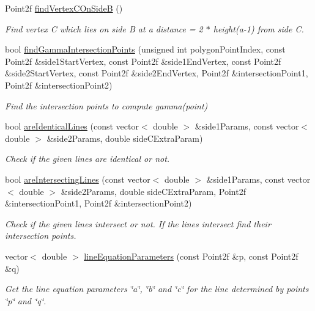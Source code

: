 \begin{DoxyCompactItemize}
Point2f \hyperlink{classmultiscale_1_1MinEnclosingTriangleFinder_ab0b488d2d67f2d22077777eebc292c1a}{find\-Vertex\-C\-On\-Side\-B} ()
\begin{DoxyCompactList}\small\item\em Find vertex C which lies on side B at a distance = 2 $\ast$ height(a-\/1) from side C. \end{DoxyCompactList}\item 
bool \hyperlink{classmultiscale_1_1MinEnclosingTriangleFinder_a9eedc43ea3190d8ee6343879dc100edb}{find\-Gamma\-Intersection\-Points} (unsigned int polygon\-Point\-Index, const Point2f \&side1\-Start\-Vertex, const Point2f \&side1\-End\-Vertex, const Point2f \&side2\-Start\-Vertex, const Point2f \&side2\-End\-Vertex, Point2f \&intersection\-Point1, Point2f \&intersection\-Point2)
\begin{DoxyCompactList}\small\item\em Find the intersection points to compute gamma(point) \end{DoxyCompactList}\item 
bool \hyperlink{classmultiscale_1_1MinEnclosingTriangleFinder_a65a15d407aeab7f9b81fe527c9a53e81}{are\-Identical\-Lines} (const vector$<$ double $>$ \&side1\-Params, const vector$<$ double $>$ \&side2\-Params, double side\-C\-Extra\-Param)
\begin{DoxyCompactList}\small\item\em Check if the given lines are identical or not. \end{DoxyCompactList}\item 
bool \hyperlink{classmultiscale_1_1MinEnclosingTriangleFinder_a890d17359c3cdf30b6c20b08cd12b6c9}{are\-Intersecting\-Lines} (const vector$<$ double $>$ \&side1\-Params, const vector$<$ double $>$ \&side2\-Params, double side\-C\-Extra\-Param, Point2f \&intersection\-Point1, Point2f \&intersection\-Point2)
\begin{DoxyCompactList}\small\item\em Check if the given lines intersect or not. If the lines intersect find their intersection points. \end{DoxyCompactList}\item 
vector$<$ double $>$ \hyperlink{classmultiscale_1_1MinEnclosingTriangleFinder_ab2aa08fbf3d17d25f55eb21cd2524975}{line\-Equation\-Parameters} (const Point2f \&p, const Point2f \&q)
\begin{DoxyCompactList}\small\item\em Get the line equation parameters \char`\"{}a\char`\"{}, \char`\"{}b\char`\"{} and \char`\"{}c\char`\"{} for the line determined by points \char`\"{}p\char`\"{} and \char`\"{}q\char`\"{}. \end{DoxyCompactList}\item 

\end{DoxyCompactItemize}
